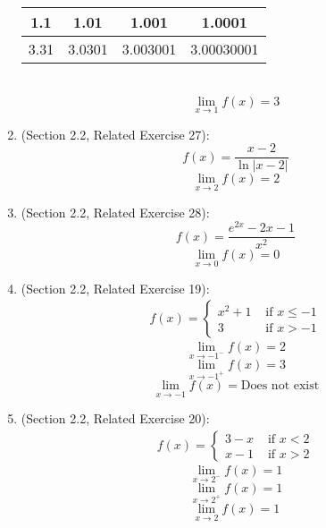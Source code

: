 \documentclass{article}
\begin{document}
\begin{enumerate}
	    \begin{tabular}{| c | c | c | c |}
            \hline
	        1.1 & 1.01 & 1.001 & 1.0001 \\
            \hline
	        3.31 & 3.0301 & 3.003001 & 3.00030001 \\
            \hline
        \end{tabular} \\
    
	    $$\lim_{x \to 1}{f(x)} = 3$$
    \item (Section 2.2, Related Exercise 27):
	    $$f(x) = \frac{x-2}{\ln|x-2|}$$
	    $$\lim_{x \to 2}{f(x)} = 2$$
    \item (Section 2.2, Related Exercise 28):
	    $$f(x) = \frac{e^{2x} - 2x - 1}{x^2}$$
	    $$\lim_{x \to 0}{f(x)} = 0$$
    \item (Section 2.2, Related Exercise 19):
	    $$\begin{aligned}f(x) = \begin{cases}
	    x^2 + 1 &\text{ if } x \leq -1 \\
	    3 &\text{ if } x > -1
	    \end{cases}\end{aligned}$$
		$$\lim_{x \to -1^-}{f(x)} = 2$$
		$$\lim_{x \to -1^+}{f(x)} = 3$$
		$$\lim_{x \to -1}{f(x)} = \text{Does not exist}$$
    \item (Section 2.2, Related Exercise 20):
	    $$\begin{aligned}f(x) = \begin{cases}
	    3 - x &\text{ if } x < 2 \\
	    x - 1 &\text{ if } x >2
	    \end{cases}\end{aligned}$$
	    $$\lim_{x \to 2^-}{f(x)} = 1$$
	    $$\lim_{x \to 2^+}{f(x)} = 1$$
	    $$\lim_{x \to 2}{f(x)} = 1$$


\end{enumerate}
\end{document}
